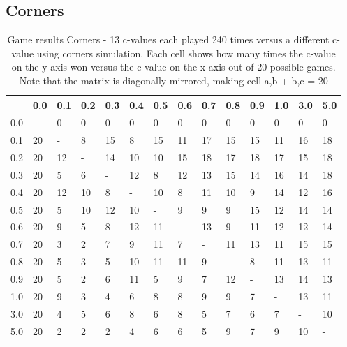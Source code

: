 \documentclass[11pt,a4paper]{article}
\begin{document}
\begin{appendices}
\subsection{Corners}
\begin{table}[H]
	\centering
	\begin{tabular}{|l||l|l|l|l|l|l|l|l|l|l|l|l|l|}
		\hline 
		& 0.0 & 0.1 & 0.2 & 0.3 & 0.4 & 0.5 & 0.6 & 0.7 & 0.8 & 0.9 & 1.0 & 3.0 & 5.0 \\ \hline
		\hline
		0.0 & -   & 0   & 0   & 0   & 0   & 0   & 0   & 0   & 0   & 0   & 0   & 0   & 0   \\ \hline
		0.1 & 20  & -   & 8   & 15  & 8   & 15  & 11  & 17  & 15  & 15  & 11  & 16  & 18  \\ \hline
		0.2 & 20  & 12  & -   & 14  & 10  & 10  & 15  & 18  & 17  & 18  & 17  & 15  & 18  \\ \hline
		0.3 & 20  & 5   & 6   & -   & 12  & 8   & 12  & 13  & 15  & 14  & 16  & 14  & 18  \\ \hline
		0.4 & 20  & 12  & 10  & 8   & -   & 10  & 8   & 11  & 10  & 9   & 14  & 12  & 16  \\ \hline
		0.5 & 20  & 5   & 10  & 12  & 10  & -   & 9   & 9   & 9   & 15  & 12  & 14  & 14  \\ \hline
		0.6 & 20  & 9   & 5   & 8   & 12  & 11  & -   & 13  & 9   & 11  & 12  & 12  & 14  \\ \hline
		0.7 & 20  & 3   & 2   & 7   & 9   & 11  & 7   & -   & 11  & 13  & 11  & 15  & 15  \\ \hline
		0.8 & 20  & 5   & 3   & 5   & 10  & 11  & 11  & 9   & -   & 8   & 11  & 13  & 11  \\ \hline
		0.9 & 20  & 5   & 2   & 6   & 11  & 5   & 9   & 7   & 12  & -   & 13  & 14  & 13  \\ \hline
		1.0 & 20  & 9   & 3   & 4   & 6   & 8   & 8   & 9   & 9   & 7   & -   & 13  & 11  \\ \hline
		3.0 & 20  & 4   & 5   & 6   & 8   & 6   & 8   & 5   & 7   & 6   & 7   & -   & 10  \\ \hline
		5.0 & 20  & 2   & 2   & 2   & 4   & 6   & 6   & 5   & 9   & 7   & 9   & 10  & -   \\ \hline
	\end{tabular}
	\caption{Game results Corners - 13 c-values each played 240 times versus a different c-value using corners simulation. Each cell shows how many times the c-value on the y-axis won versus the c-value on the x-axis out of 20 possible games. Note that the matrix is diagonally mirrored, making cell a,b + b,c = 20}
	\label{table:ranking-matrix-corners}
\end{table}


\end{appendices}
\end{document}
